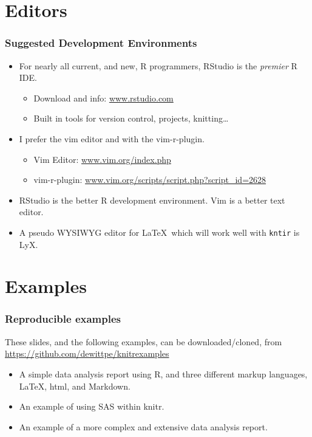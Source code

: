 \documentclass[t]{beamer}\usepackage[]{graphicx}\usepackage[]{color}
\begin{document}
\section{Editors} 
\begin{frame}
  \frametitle{Suggested Development Environments}

  \begin{itemize}
    \item For nearly all current, and new,  R programmers, 
      RStudio is the \emph{premier} R IDE.
      \begin{itemize}
        \item Download and info: \url{www.rstudio.com}

        \item Built in tools for version control, projects, knitting\ldots
      \end{itemize}

    \item I prefer the vim editor and with the vim-r-plugin.  
      \begin{itemize}
        \item Vim Editor: \url{www.vim.org/index.php}
        \item vim-r-plugin: \url{www.vim.org/scripts/script.php?script\_id=2628} 
      \end{itemize}

    \item RStudio is the better R development environment.  Vim is a better text
      editor.

    \item A pseudo WYSIWYG editor for \LaTeX\ which will work well with 
      {\tt kntir} is LyX.
      
  \end{itemize}
\end{frame}

\section{Examples}
\begin{frame}
  \frametitle{Reproducible examples}
  These slides, and the following examples, can be downloaded/cloned, from
  \url{https://github.com/dewittpe/knitrexamples}

  \begin{itemize}
    \item A simple data analysis report using R, and three different markup
      languages, \LaTeX, html, and Markdown.
    \item An example of using SAS within knitr.
    \item An example of a more complex and extensive data analysis report.
  \end{itemize}
\end{frame}
\end{document}
